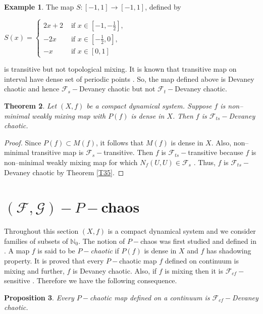 \documentclass{amsart}[12pt, papera4]
\newtheorem{theorem}{Theorem}[section]
\newtheorem{proposition}[theorem]{Proposition}
\theoremstyle{definition}
\newtheorem{example}[theorem]{Example}
\theoremstyle{remark}
\numberwithin{equation}{section}
\def\N{{\mathbb N}}
\def\F{{\mathscr{F}}}
\begin{document}
\smallskip		
\begin{example}\label{2.6} The map $S:[-1,1]\longrightarrow [-1,1]$, defined by 
	\begin{center}
		$S(x)=\left\{ \begin{array}{llc}
			2x+2 & \mbox{ if } x\in [-1,-\frac{1}{2}],\\ 
			-2x & \mbox{ if } x\in [-\frac{1}{2},0], \\
			-x & \mbox{ if } x\in [0,1]
		\end{array} \right.$
	\end{center}
	is transitive but not topological mixing. It is known that transitive map on interval have dense set of periodic points \cite{Michel}. So, the map defined above is Devaney chaotic and hence $\F_s-$Devaney chaotic but not $\F_t-$Devaney chaotic.
\end{example}


\smallskip
\begin{theorem}\label{3.10}
	Let $(X,f)$ be a compact dynamical system. Suppose $f$ is non--minimal weakly mixing map with $P(f)$ is dense in $X$. Then $f$ is $\F_{ts}-$Devaney chaotic.
\end{theorem}

\begin{proof}
	Since $P(f)\subset M(f)$, it follows that $M(f)$ is dense in $X$. Also, non--minimal transitive map is $\F_s-$transitive\cite{TKS}. Then $f$ is $\F_{ts}-$transitive because $f$ is non--minimal weakly mixing map for which $N_f(U,U)\in \F_s$ \cite[Theorem 4.7 (1)]{Wen}. Thus, $f$ is $\F_{ts}-$Devaney chaotic by Theorem \ref{T35}.
\end{proof}


\section{$(\mathscr{F},\mathscr{G})-P-$chaos}

\medskip
\noindent Throughout this section $(X,f)$ is a compact dynamical system and we consider families of subsets of $\N_0$. The notion of $P-$chaos was first studied and defined in \cite{Arai}. A map $f$ is said to be \emph{$P-$chaotic} if $P(f)$ is dense in $X$ and $f$ has shadowing property. It is proved that every $P-$chaotic map $f$ defined on continuum is mixing and further, $f$ is Devaney chaotic. Also, if $f$ is mixing then it is $\F_{cf}-$sensitive \cite{TKS}. Therefore we have the following consequence.

\begin{proposition}\label{3.1}
	Every $P-$chaotic map defined on a continuum is $\F_{cf}-$Devaney chaotic.
\end{proposition}
\end{document}
